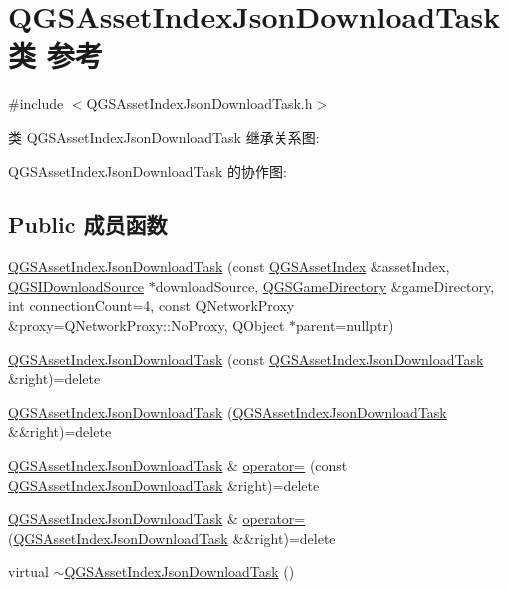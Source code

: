 \hypertarget{class_q_g_s_asset_index_json_download_task}{}\section{Q\+G\+S\+Asset\+Index\+Json\+Download\+Task类 参考}
\label{class_q_g_s_asset_index_json_download_task}


{\ttfamily \#include $<$Q\+G\+S\+Asset\+Index\+Json\+Download\+Task.\+h$>$}



类 Q\+G\+S\+Asset\+Index\+Json\+Download\+Task 继承关系图\+:


Q\+G\+S\+Asset\+Index\+Json\+Download\+Task 的协作图\+:
\subsection*{Public 成员函数}
\begin{DoxyCompactItemize}
\item 
\mbox{\hyperlink{class_q_g_s_asset_index_json_download_task_ace53313bb67a3b8af6b11b80dee55a29}{Q\+G\+S\+Asset\+Index\+Json\+Download\+Task}} (const \mbox{\hyperlink{class_q_g_s_asset_index}{Q\+G\+S\+Asset\+Index}} \&asset\+Index, \mbox{\hyperlink{class_q_g_s_i_download_source}{Q\+G\+S\+I\+Download\+Source}} $\ast$download\+Source, \mbox{\hyperlink{class_q_g_s_game_directory}{Q\+G\+S\+Game\+Directory}} \&game\+Directory, int connection\+Count=4, const Q\+Network\+Proxy \&proxy=Q\+Network\+Proxy\+::\+No\+Proxy, Q\+Object $\ast$parent=nullptr)
\item 
\mbox{\hyperlink{class_q_g_s_asset_index_json_download_task_a3a066ea44aa8b747cd7d7f305ff4e1a0}{Q\+G\+S\+Asset\+Index\+Json\+Download\+Task}} (const \mbox{\hyperlink{class_q_g_s_asset_index_json_download_task}{Q\+G\+S\+Asset\+Index\+Json\+Download\+Task}} \&right)=delete
\item 
\mbox{\hyperlink{class_q_g_s_asset_index_json_download_task_a7da147eccc0ad74fdcdf6258d41a7af1}{Q\+G\+S\+Asset\+Index\+Json\+Download\+Task}} (\mbox{\hyperlink{class_q_g_s_asset_index_json_download_task}{Q\+G\+S\+Asset\+Index\+Json\+Download\+Task}} \&\&right)=delete
\item 
\mbox{\hyperlink{class_q_g_s_asset_index_json_download_task}{Q\+G\+S\+Asset\+Index\+Json\+Download\+Task}} \& \mbox{\hyperlink{class_q_g_s_asset_index_json_download_task_accfc355de5caa38efc3ccd042fe12c16}{operator=}} (const \mbox{\hyperlink{class_q_g_s_asset_index_json_download_task}{Q\+G\+S\+Asset\+Index\+Json\+Download\+Task}} \&right)=delete
\item 
\mbox{\hyperlink{class_q_g_s_asset_index_json_download_task}{Q\+G\+S\+Asset\+Index\+Json\+Download\+Task}} \& \mbox{\hyperlink{class_q_g_s_asset_index_json_download_task_aaf4a90201e87a5b12ab695f92f9422b0}{operator=}} (\mbox{\hyperlink{class_q_g_s_asset_index_json_download_task}{Q\+G\+S\+Asset\+Index\+Json\+Download\+Task}} \&\&right)=delete
\item 
virtual \mbox{\hyperlink{class_q_g_s_asset_index_json_download_task_aa6aa04b209c68aa2f256795b8002d261}{$\sim$\+Q\+G\+S\+Asset\+Index\+Json\+Download\+Task}} ()
\end{DoxyCompactItemize}
